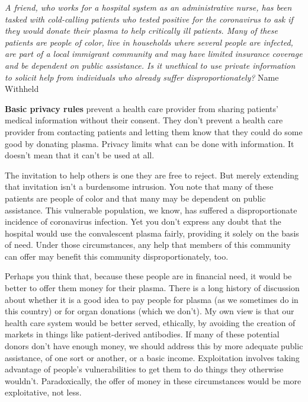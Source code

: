 \emph{A friend, who works for a hospital system as an administrative
nurse, has been tasked with cold-calling patients who tested positive
for the coronavirus to ask if they would donate their plasma to help
critically ill patients. Many of these patients are people of color,
live in households where several people are infected, are part of a
local immigrant community and may have limited insurance coverage and be
dependent on public assistance. Is it unethical to use private
information to solicit help from individuals who already suffer
disproportionately?} Name Withheld

\textbf{Basic privacy rules} prevent a health care provider from sharing
patients' medical information without their consent. They don't prevent
a health care provider from contacting patients and letting them know
that they could do some good by donating plasma. Privacy limits what can
be done with information. It doesn't mean that it can't be used at all.

The invitation to help others is one they are free to reject. But merely
extending that invitation isn't a burdensome intrusion. You note that
many of these patients are people of color and that many may be
dependent on public assistance. This vulnerable population, we know, has
suffered a disproportionate incidence of coronavirus infection. Yet you
don't express any doubt that the hospital would use the convalescent
plasma fairly, providing it solely on the basis of need. Under those
circumstances, any help that members of this community can offer may
benefit this community disproportionately, too.

Perhaps you think that, because these people are in financial need, it
would be better to offer them money for their plasma. There is a long
history of discussion about whether it is a good idea to pay people for
plasma (as we sometimes do in this country) or for organ donations
(which we don't). My own view is that our health care system would be
better served, ethically, by avoiding the creation of markets in things
like patient-derived antibodies. If many of these potential donors don't
have enough money, we should address this by more adequate public
assistance, of one sort or another, or a basic income. Exploitation
involves taking advantage of people's vulnerabilities to get them to do
things they otherwise wouldn't. Paradoxically, the offer of money in
these circumstances would be more exploitative, not less.

